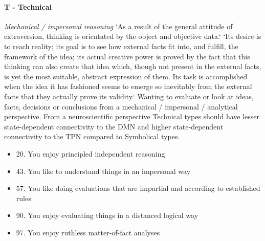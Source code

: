 \documentclass[11pt,a4paper]{article}
\begin{document}
\paragraph{T - Technical}
\emph{Mechanical / impersonal reasoning}
`As a result of the general attitude of extraversion, thinking is orientated by the object and objective data.`\cite[p.428]{jung1}
`Its desire is to reach reality; its goal is to see how external facts fit into, and fulfill, the framework of the idea; its actual creative power is proved by the fact that this thinking can also create that idea which, though not present in the external facts, is yet the most suitable, abstract expression of them. Its task is accomplished when the idea it has fashioned seems to emerge so inevitably from the external facts that they actually prove its validity.`\cite[p.481]{jung1}
Wanting to evaluate or look at ideas, facts, decisions or conclusions from a mechanical / impersonal / analytical perspective.
From a neuroscientific perspective Technical types should have lesser state-dependent connectivity to the DMN and higher state-dependent connectivity to the TPN compared to Symbolical types.
\begin{itemize}
\item 20. You enjoy principled independent reasoning
\item 43. You like to understand things in an impersonal way
\item 57. You like doing evaluations that are impartial and according to established rules
\item 90. You enjoy evaluating things in a distanced logical way
\item 97. You enjoy ruthless matter-of-fact analyses
\end{itemize}
\end{document}
